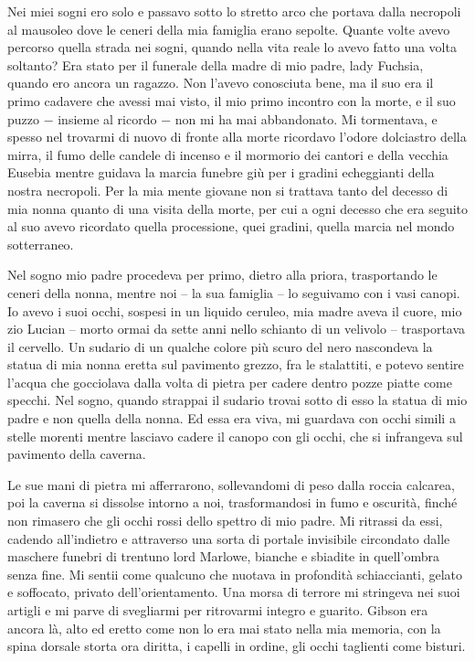 Nei miei sogni ero solo e passavo sotto lo stretto arco che portava
dalla necropoli al mausoleo dove le ceneri della mia famiglia erano
sepolte. Quante volte avevo percorso quella strada nei sogni, quando
nella vita reale lo avevo fatto una volta soltanto? Era stato per il
funerale della madre di mio padre, lady Fuchsia, quando ero ancora un
ragazzo. Non l'avevo conosciuta bene, ma il suo era il primo cadavere
che avessi mai visto, il mio primo incontro con la morte, e il suo puzzo
− insieme al ricordo − non mi ha mai abbandonato. Mi tormentava, e
spesso nel trovarmi di nuovo di fronte alla morte ricordavo l'odore
dolciastro della mirra, il fumo delle candele di incenso e il mormorio
dei cantori e della vecchia Eusebia mentre guidava la marcia funebre giù
per i gradini echeggianti della nostra necropoli. Per la mia mente
giovane non si trattava tanto del decesso di mia nonna quanto di una
visita della morte, per cui a ogni decesso che era seguito al suo avevo
ricordato quella processione, quei gradini, quella marcia nel mondo
sotterraneo.

Nel sogno mio padre procedeva per primo, dietro alla priora,
trasportando le ceneri della nonna, mentre noi -- la sua famiglia -- lo
seguivamo con i vasi canopi. Io avevo i suoi occhi, sospesi in un
liquido ceruleo, mia madre aveva il cuore, mio zio Lucian -- morto ormai
da sette anni nello schianto di un velivolo -- trasportava il cervello.
Un sudario di un qualche colore più scuro del nero nascondeva la statua
di mia nonna eretta sul pavimento grezzo, fra le stalattiti, e potevo
sentire l'acqua che gocciolava dalla volta di pietra per cadere dentro
pozze piatte come specchi. Nel sogno, quando strappai il sudario trovai
sotto di esso la statua di mio padre e non quella della nonna. Ed essa
era viva, mi guardava con occhi simili a stelle morenti mentre lasciavo
cadere il canopo con gli occhi, che si infrangeva sul pavimento della
caverna.

Le sue mani di pietra mi afferrarono, sollevandomi di peso dalla roccia
calcarea, poi la caverna si dissolse intorno a noi, trasformandosi in
fumo e oscurità, finché non rimasero che gli occhi rossi dello spettro
di mio padre. Mi ritrassi da essi, cadendo all'indietro e attraverso una
sorta di portale invisibile circondato dalle maschere funebri di
trentuno lord Marlowe, bianche e sbiadite in quell'ombra senza fine. Mi
sentii come qualcuno che nuotava in profondità schiaccianti, gelato e
soffocato, privato dell'orientamento. Una morsa di terrore mi stringeva
nei suoi artigli e mi parve di svegliarmi per ritrovarmi integro e
guarito. Gibson era ancora là, alto ed eretto come non lo era mai stato
nella mia memoria, con la spina dorsale storta ora diritta, i capelli in
ordine, gli occhi taglienti come bisturi.

